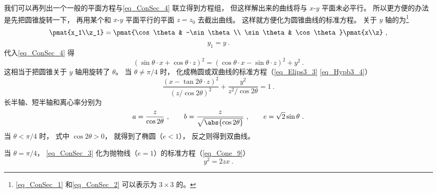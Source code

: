 我们可以再列出一个一般的平面方程与\autoref{eq_ConSec_4} 联立得到方程组， 但这样解出来的曲线将与 $x$-$y$ 平面未必平行。 所以更方便的办法是先把圆锥旋转一下， 再用某个和 $x$-$y$ 平面平行的平面 $z = z_0$ 去截出曲线。 这样就方便化为圆锥曲线的标准方程。 关于 $y$ 轴的为\footnote{\autoref{eq_ConSec_1} 和\autoref{eq_ConSec_2} 可以表示为 $3\times 3$ 的。}
\begin{equation}\label{eq_ConSec_1}
\pmat{x_1\\z_1} = \pmat{\cos\theta & -\sin\theta\\ \sin\theta & \cos\theta}\pmat{x\\z}~,
\end{equation}
\begin{equation}\label{eq_ConSec_2}
y_1 = y~.
\end{equation}
代入\autoref{eq_ConSec_4} 得
\begin{equation}\label{eq_ConSec_3}
(\sin\theta\cdot x + \cos\theta\cdot z)^2 = (\cos\theta\cdot x - \sin\theta\cdot z)^2 + y^2~.
\end{equation}
这相当于把圆锥关于 $y$ 轴用旋转了 $\theta$。 当 $\theta \ne \pi/4$ 时， 化成椭圆或双曲线的标准方程（\autoref{eq_Elips3_3}  \autoref{eq_Hypb3_4}）
\begin{equation}
\frac{(x - \tan2\theta \cdot z)^2}{(z/\cos2\theta)^2} + \frac{y^2}{z^2/\cos2\theta} = 1~.
\end{equation}
长半轴、短半轴和离心率分别为
\begin{equation}
a = \frac{z}{\cos2\theta}~,
\qquad
b = \frac{z}{\sqrt{\abs{\cos2\theta}}}~,
\qquad
e = \sqrt{2}\sin\theta~.
\end{equation}
当 $\theta < \pi/4$ 时， 式中 $\cos2\theta > 0$， 就得到了椭圆（$e < 1$）， 反之则得到双曲线。

当 $\theta = \pi/4$， \autoref{eq_ConSec_3} 化为抛物线（$e = 1$）的标准方程（\autoref{eq_Cone_9}）
\begin{equation}
y^2 = 2zx~.
\end{equation}
